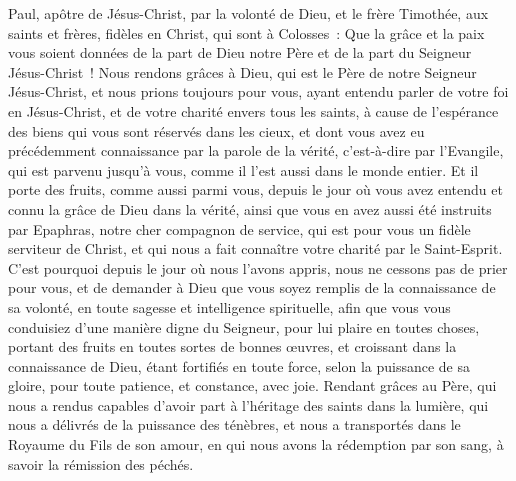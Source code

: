 \begin{multicols}{2}
\VerseOne{}Paul, apôtre de Jésus-Christ, par la volonté de Dieu, et le frère Timothée,
aux saints et frères, fidèles en Christ, qui sont à Colosses~: Que la grâce et la paix vous soient données de la part de Dieu notre Père et de la part du Seigneur Jésus-Christ~!
Nous rendons grâces à Dieu, qui est le Père de notre Seigneur Jésus-Christ, et nous prions toujours pour vous,
ayant entendu parler de votre foi en Jésus-Christ, et de votre charité envers tous les saints,
à cause de l'espérance des biens qui vous sont réservés dans les cieux, et dont vous avez eu précédemment connaissance par la parole de la vérité, c'est-à-dire par l'Evangile,
qui est parvenu jusqu'à vous, comme il l'est aussi dans le monde entier. Et il porte des fruits, comme aussi parmi vous, depuis le jour où vous avez entendu et connu la grâce de Dieu dans la vérité,
ainsi que vous en avez aussi été instruits par Epaphras, notre cher compagnon de service, qui est pour vous un fidèle serviteur de Christ,
et qui nous a fait connaître votre charité par le Saint-Esprit.
C'est pourquoi depuis le jour où nous l'avons appris, nous ne cessons pas de prier pour vous, et de demander à Dieu que vous soyez remplis de la connaissance de sa volonté, en toute sagesse et intelligence spirituelle,
afin que vous vous conduisiez d'une manière digne du Seigneur, pour lui plaire en toutes choses, portant des fruits en toutes sortes de bonnes œuvres, et croissant dans la connaissance de Dieu,
étant fortifiés en toute force, selon la puissance de sa gloire, pour toute patience, et constance, avec joie.
Rendant grâces au Père, qui nous a rendus capables d'avoir part à l'héritage des saints dans la lumière,
qui nous a délivrés de la puissance des ténèbres, et nous a transportés dans le Royaume du Fils de son amour,
en qui nous avons la rédemption par son sang, à savoir la rémission des péchés.

\end{multicols}
